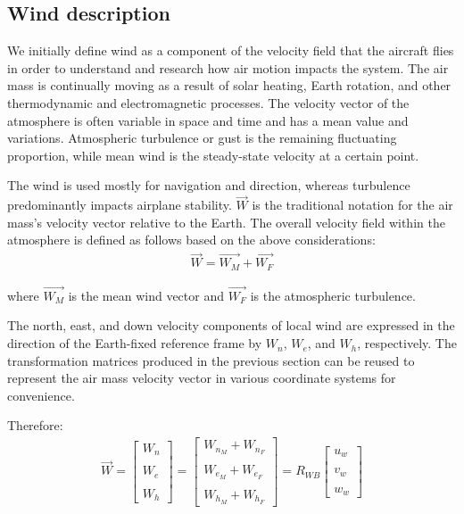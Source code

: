 \documentclass[conference]{IEEEtran}
\begin{document}
\subsection{Wind description}
We initially define wind as a component of the velocity field that the aircraft
flies in order to understand and research how air motion impacts the system.
The air mass is continually moving as a result of solar heating, Earth
rotation, and other thermodynamic and electromagnetic processes. The velocity
vector of the atmosphere is often variable in space and time and has a mean
value and variations. Atmospheric turbulence or gust is the remaining
fluctuating proportion, while mean wind is the steady-state velocity at a
certain point.
\par
The wind is used mostly for navigation and direction, whereas turbulence
predominantly impacts airplane stability. $\vec{W}$ is the traditional notation
for the air mass's velocity vector relative to the Earth. The overall velocity
field within the atmosphere is defined as follows based on the above
considerations:
\begin{align}
    \vec{W}=\vec{W_M}+\vec{W_F}
\end{align}
\par
where $\vec{W_M}$ is the mean wind vector and $\vec{W_F}$ is the atmospheric
turbulence.
\par
The north, east, and down velocity components of local wind are expressed in
the direction of the Earth-fixed reference frame by $W_n$, $W_e$, and $W_h$,
respectively. The transformation matrices produced in the previous section can
be reused to represent the air mass velocity vector in various coordinate
systems for convenience.
\par
Therefore:
\begin{align}
    \vec{W}=\begin{bmatrix}
                W_n \\\\
                W_e \\\\
                W_h
            \end{bmatrix}=
    \begin{bmatrix}
        W_{n_M}+W_{n_F} \\\\
        W_{e_M}+W_{e_F} \\\\
        W_{h_M}+W_{h_F}
    \end{bmatrix}
    =R_{WB}\begin{bmatrix}
               u_w \\\\
               v_w \\\\
               w_w
           \end{bmatrix}
\end{align}
\end{document}
